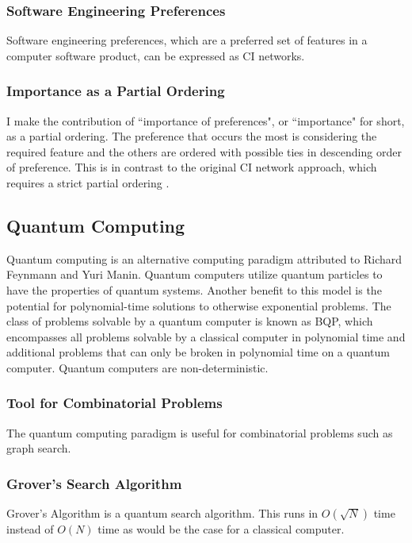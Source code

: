 \documentclass[12pt]{article}
\begin{document}
\begin{flushleft}
\subsubsection{Software Engineering Preferences}
Software engineering preferences, which are a preferred set of features in a computer software product, can be expressed as CI networks.

\subsubsection{Importance as a Partial Ordering}
I make the contribution of ``importance of preferences", or ``importance" for short, as a partial ordering. The preference that occurs the most is considering the required feature and the others are ordered with possible ties in descending order of preference. This is in contrast to the original CI network approach, which requires a strict partial ordering \cite{oster_scalable_2015}.

\subsection{Quantum Computing}
Quantum computing is an alternative computing paradigm attributed to Richard Feynmann and Yuri Manin. Quantum computers utilize quantum particles to have the properties of quantum systems. Another benefit to this model is the potential for polynomial-time solutions to otherwise exponential problems. The class of problems solvable by a quantum computer is known as BQP, which encompasses all problems solvable by a classical computer in polynomial time and additional problems that can only be broken in polynomial time on a quantum computer. Quantum computers are non-deterministic.
\subsubsection{Tool for Combinatorial Problems}
The quantum computing paradigm is useful for combinatorial problems such as graph search.
\subsubsection{Grover's Search Algorithm}
Grover's Algorithm is a quantum search algorithm. This runs in $O(\sqrt{N})$ time instead of $O(N)$ time as would be the case for a classical computer.


\end{flushleft}
\end{document}
